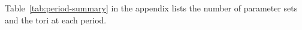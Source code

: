 \par
Table~\ref{tab:period-summary} in the appendix lists the number
of parameter sets and the tori at each period.
